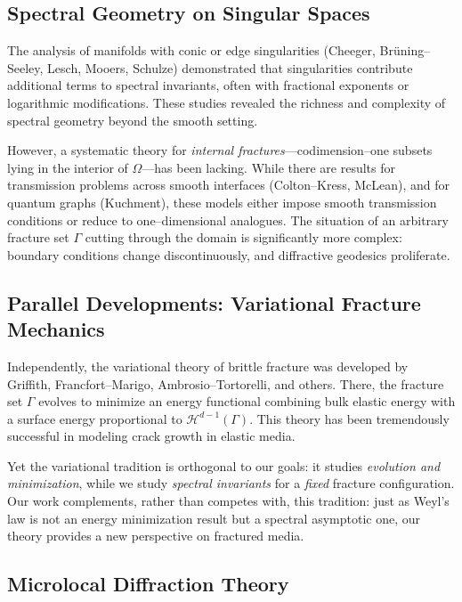 \subsection{Spectral Geometry on Singular Spaces}

The analysis of manifolds with conic or edge singularities (Cheeger, Br\"uning–
Seeley, Lesch, Mooers, Schulze) demonstrated that singularities contribute 
additional terms to spectral invariants, often with fractional exponents or 
logarithmic modifications. These studies revealed the richness and complexity 
of spectral geometry beyond the smooth setting.

However, a systematic theory for \emph{internal fractures}—codimension–one 
subsets lying in the interior of $\Omega$—has been lacking. While there are 
results for transmission problems across smooth interfaces (Colton–Kress, 
McLean), and for quantum graphs (Kuchment), these models either impose smooth 
transmission conditions or reduce to one–dimensional analogues. The situation 
of an arbitrary fracture set $\Gamma$ cutting through the domain is 
significantly more complex: boundary conditions change discontinuously, and 
diffractive geodesics proliferate.

\subsection{Parallel Developments: Variational Fracture Mechanics}

Independently, the variational theory of brittle fracture was developed by 
Griffith, Francfort–Marigo, Ambrosio–Tortorelli, and others. There, the 
fracture set $\Gamma$ evolves to minimize an energy functional combining bulk 
elastic energy with a surface energy proportional to $\mathcal H^{d-1}(\Gamma)$. 
This theory has been tremendously successful in modeling crack growth in 
elastic media.

Yet the variational tradition is orthogonal to our goals: it studies 
\emph{evolution and minimization}, while we study \emph{spectral invariants} 
for a \emph{fixed} fracture configuration. Our work complements, rather than 
competes with, this tradition: just as Weyl’s law is not an energy minimization 
result but a spectral asymptotic one, our theory provides a new perspective on 
fractured media.

\subsection{Microlocal Diffraction Theory}

